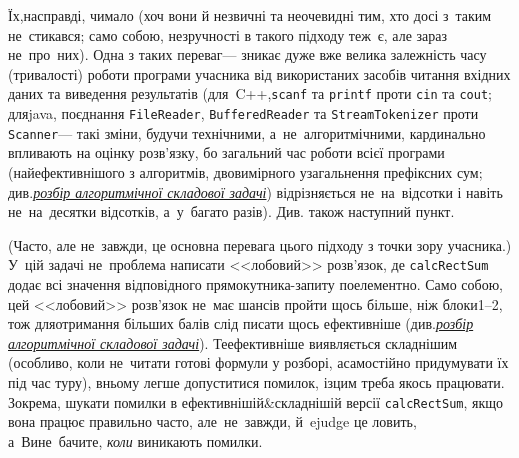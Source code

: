Їх,\nolinebreak[3] насправді, чимало (хоч вони й \mbox{незвичні} та неоче\-видні тим, хто досі з~таким не~стикався; 
само собою, незручності в такого підходу теж~є, але зараз не~про~них).
Одна з таких переваг\nolinebreak[3] --- зникає дуже вже велика залежність часу (тривалості) роботи програми учасника від використаних засобів читання вхідних даних та виведення результатів (для~C++,\nolinebreak[2] \texttt{scanf} та \texttt{printf} проти \texttt{cin} та \texttt{cout}; для\nolinebreak[2] java, поєднання \texttt{FileReader}, 
\texttt{BufferedReader} та 
\texttt{StreamTokenizer}
проти 
\texttt{Scanner}\nolinebreak[3] --- такі зміни, будучи технічними, а~не~алгоритмічними, кардинально впливають на оцінку розв'язку, бо загальний час роботи всієї програми (найефективнішого з алгоритмів, двовимірного узагальнення префіксних сум; див.\nolinebreak[3] \href{https://ejudge.ckipo.edu.ua/coll_new_A4_11pt.pdf#page=108}{\emph{розбір алгоритмічної складової задачі}}) відрізняється не~на~відсотки і навіть не~на~десятки відсотків, а~у~багато разів).
Див. також наступний пункт.

(Часто, але не~завжди, це основна перевага цього підходу з точки зору учасника.)
У~цій задачі не~проблема написати <<лобовий>> розв'язок, де \texttt{calcRectSum} додає всі значення відповідного прямокутника-запиту поелементно. Само собою, цей <<лобовий>> розв'язок не~має шансів пройти щось більше, ніж блоки\nolinebreak[2] \mbox{1--2}, тож для\nolinebreak[2] отримання більших балів слід писати щось ефективніше (див.\nolinebreak[3] \href{https://ejudge.ckipo.edu.ua/coll_new_A4_11pt.pdf#page=108}{\emph{розбір алгоритмічної складової задачі}}). 
Те\nolinebreak[3] ефективніше виявляється складнішим (особливо, коли не~читати готові формули у розборі, а\nolinebreak[3] самостійно придумувати їх під час туру), в\nolinebreak[3] ньому легше допуститися помилок, і\nolinebreak[3] з\nolinebreak[3] цим треба якось працювати. Зокрема, шукати помилки в ефе\-ктив\-ні\-шій\&склад\-ні\-шій версії \texttt{calcRectSum}, якщо вона працює правильно часто, але~не~завжди, й~ejudge це ловить, а~Ви\nolinebreak[2] не~бачите, \emph{коли} виникають помилки.

